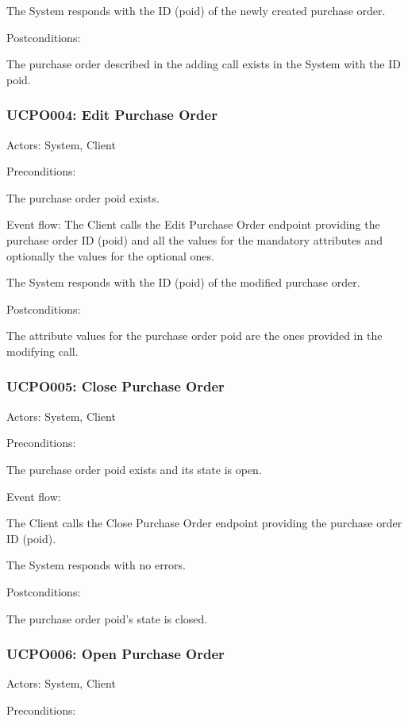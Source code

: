 \ucitem The System responds with the ID (poid) of the newly created purchase order.

Postconditions:

\ucitem The purchase order described in the adding call exists in the System with the ID poid.

\subsubsection{UCPO004: Edit Purchase Order}
\label{UCPO004}

Actors: System, Client

Preconditions:

\ucitem The purchase order poid exists.

Event flow:
\ucitem The Client calls the Edit Purchase Order endpoint providing the purchase order ID (poid) and all the values for the mandatory attributes and optionally the values for the 
optional ones.

\ucitem The System responds with the ID (poid) of the modified purchase order.

Postconditions:

\ucitem The attribute values for the purchase order poid are the ones provided in the modifying call.

\subsubsection{UCPO005: Close Purchase Order}
\label{UCPO005}

Actors: System, Client

Preconditions:

\ucitem The purchase order poid exists and its state is open.

Event flow:

\ucitem The Client calls the Close Purchase Order endpoint providing the purchase order ID (poid).

\ucitem The System responds with no errors.

Postconditions:

\ucitem The purchase order poid’s state is closed.

\subsubsection{UCPO006: Open Purchase Order}
\label{UCPO006}

Actors: System, Client

Preconditions:


